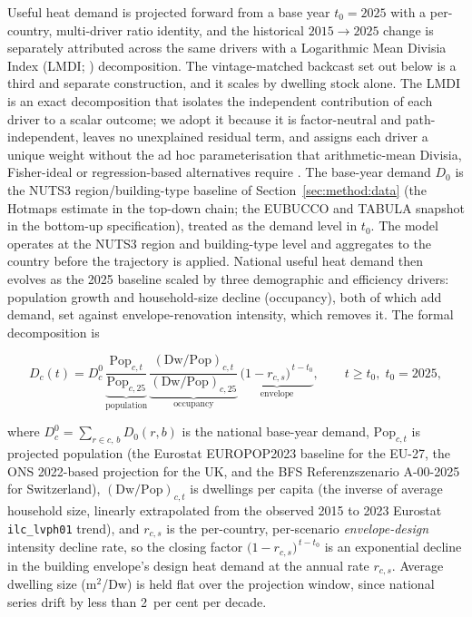 Useful heat demand is projected forward from a base year $t_0 = 2025$ with a
per-country, multi-driver ratio identity, and the historical $2015\to2025$ change is
separately attributed across the same drivers with a Logarithmic Mean Divisia Index
(LMDI; \citealp{Ang2005}) decomposition. The vintage-matched backcast set out below is a third and separate construction, and it scales by dwelling stock alone. The LMDI is an exact decomposition that isolates the
independent contribution of each driver to a scalar outcome; we adopt it because it
is factor-neutral and path-independent, leaves no unexplained residual term, and
assigns each driver a unique weight without the ad hoc parameterisation that
arithmetic-mean Divisia, Fisher-ideal or regression-based alternatives require
\citep{Ang2005}. The base-year demand $D_0$ is the NUTS3
region/building-type baseline of Section~\ref{sec:method:data} (the Hotmaps
estimate in the top-down chain; the EUBUCCO and TABULA snapshot in the bottom-up
specification), treated as the demand level in $t_0$. The model operates at the
NUTS3 region and building-type level and aggregates to the country before the
trajectory is applied. National useful heat demand then evolves as the 2025
baseline scaled by three demographic and efficiency drivers: population growth and
household-size decline (occupancy), both of which add demand, set against
envelope-renovation intensity, which removes it. The formal decomposition is

\begin{equation}
    D_c(t) = D_c^{0}\,
        \underbrace{\frac{\text{Pop}_{c,t}}{\text{Pop}_{c,25}}}_{\text{population}}\,
        \underbrace{\frac{(\text{Dw}/\text{Pop})_{c,t}}{(\text{Dw}/\text{Pop})_{c,25}}}_{\text{occupancy}}\,
        \underbrace{\bigl(1-r_{c,s}\bigr)^{\,t-t_0}}_{\text{envelope}},
    \qquad t \ge t_0,\; t_0 = 2025,
    \label{eq:demand}
\end{equation}

\noindent where $D_c^{0}=\sum_{r\in c,\,b} D_0(r,b)$ is the national base-year demand,
$\text{Pop}_{c,t}$ is projected population (the Eurostat EUROPOP2023 baseline for the
EU-27, the ONS 2022-based projection for the UK, and the BFS Referenzszenario A-00-2025
for Switzerland), $(\text{Dw}/\text{Pop})_{c,t}$ is dwellings per capita (the inverse of
average household size, linearly extrapolated from the observed 2015 to 2023 Eurostat
\texttt{ilc\_lvph01} trend), and $r_{c,s}$ is the per-country, per-scenario
\emph{envelope-design} intensity decline rate, so the closing factor
$\bigl(1-r_{c,s}\bigr)^{\,t-t_0}$ is an exponential decline in the building envelope's
design heat demand at the annual rate $r_{c,s}$. Average dwelling size ($\text{m}^2$/Dw)
is held flat over the projection window, since national series drift by less than 2~per
cent per decade.

